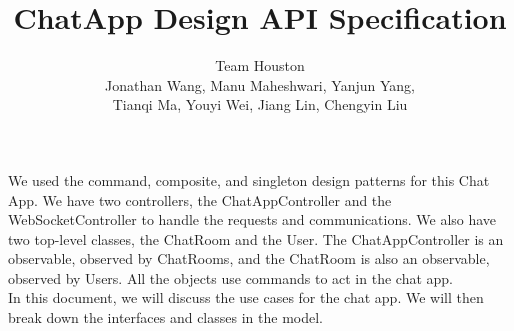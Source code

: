 \documentclass[letterpaper, 11pt]{article}
\title{ChatApp Design API Specification}
\author{Team Houston\\ Jonathan Wang, Manu Maheshwari, Yanjun Yang,\\ Tianqi Ma, Youyi Wei, Jiang Lin, Chengyin Liu}
\date{}
\begin{document}
\maketitle

We used the command, composite, and singleton design patterns for this Chat App. We have two controllers, the ChatAppController and the WebSocketController to handle the requests and communications. We also have two top-level classes, the ChatRoom and the User. The ChatAppController is an observable, observed by ChatRooms, and the ChatRoom is also an observable, observed by Users. All the objects use commands to act in the chat app. \\

In this document, we will discuss the use cases for the chat app. We will then break down the interfaces and classes in the model. 
\end{document}
